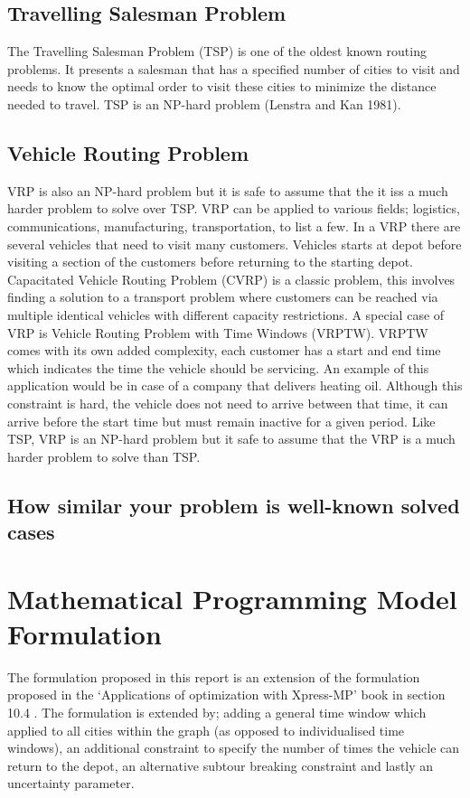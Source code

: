 \documentclass[a4paper,11pt]{article}
\begin{document}
\subsection{Travelling Salesman Problem}
The Travelling Salesman Problem (TSP) is one of the oldest known routing problems. It presents a salesman that has a specified number of cities to visit and needs to know the optimal order to visit these cities to minimize the distance needed to travel. TSP is an NP-hard problem (Lenstra and Kan 1981).

\subsection{Vehicle Routing Problem}
VRP is also an NP-hard problem but it is safe to assume that the it iss a much harder problem to solve over TSP. VRP can be applied to various fields; logistics, communications, manufacturing, transportation, to list a few. In a VRP there are several vehicles that need to visit many customers. Vehicles starts at depot before visiting a section of the customers before returning to the starting depot. 
Capacitated Vehicle Routing Problem (CVRP) is a classic problem, this involves finding a solution to a transport problem where customers can be reached via multiple identical vehicles with different capacity restrictions. 
A special case of VRP is Vehicle Routing Problem with Time Windows (VRPTW). VRPTW comes with its own added complexity, each customer has a start and end time which indicates the time the vehicle should be servicing. An example of this application would be in case of a company that delivers heating oil. Although this constraint is hard, the vehicle does not need to arrive between that time, it can arrive before the start time but must remain inactive for a given period. 
Like TSP, VRP is an NP-hard problem \cite{lenstra1981complexity} but it safe to assume that the VRP is a much harder problem to solve than TSP. 


\subsection{How similar your problem is well-known solved cases}
\section{Mathematical Programming Model Formulation}

The formulation proposed in this report is an extension of the formulation proposed in the `Applications of optimization with Xpress-MP' book in section 10.4 \cite{gueret1999applications}. The formulation is extended by; adding a general time window which applied to all cities within the graph (as opposed to individualised time windows), an additional constraint to specify the number of times the vehicle can return to the depot, an alternative subtour breaking constraint and lastly an uncertainty parameter.
\end{document}

